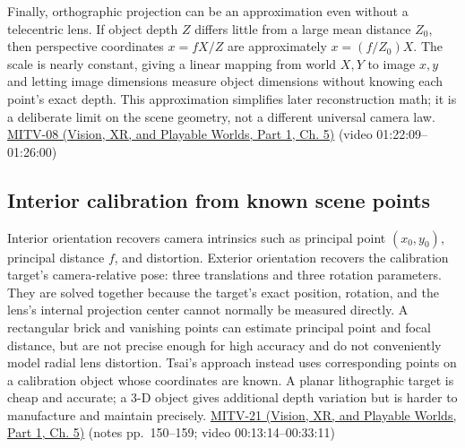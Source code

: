 Finally, orthographic projection can be an approximation even without a telecentric lens. If object depth \(Z\) differs little from a large mean distance \(Z_0\), then perspective coordinates \(x=fX/Z\) are approximately \(x=(f/Z_0)X\). The scale is nearly constant, giving a linear mapping from world \(X,Y\) to image \(x,y\) and letting image dimensions measure object dimensions without knowing each point's exact depth. This approximation simplifies later reconstruction math; it is a deliberate limit on the scene geometry, not a different universal camera law. \href{../07-Vision-XR-and-Playable-Worlds-P01/main.pdf\#nameddest=04-visual-computing-ii-ch036-mitv-08---shading-special-cases-lunar-surface-scanning-electron-microscope-greens-theorem}{MITV-08 (Vision, XR, and Playable Worlds, Part 1, Ch. 5)} (video 01:22:09--01:26:00)

\subsection{Interior calibration from known scene points}\label{03-visual-computing-i-ch003-interior-calibration-from-known-scene-points}

\hypertarget{03-visual-computing-i-ch003-interior-calibration-from-known-scene-points}{}

Interior orientation recovers camera intrinsics such as principal point \((x_0,y_0)\), principal distance \(f\), and distortion. Exterior orientation recovers the calibration target's camera-relative pose: three translations and three rotation parameters. They are solved together because the target's exact position, rotation, and the lens's internal projection center cannot normally be measured directly. A rectangular brick and vanishing points can estimate principal point and focal distance, but are not precise enough for high accuracy and do not conveniently model radial lens distortion. Tsai's approach instead uses corresponding points on a calibration object whose coordinates are known. A planar lithographic target is cheap and accurate; a 3-D object gives additional depth variation but is harder to manufacture and maintain precisely. \href{../07-Vision-XR-and-Playable-Worlds-P01/main.pdf\#nameddest=04-visual-computing-ii-ch036-mitv-21---relative-orientation-binocular-stereo-structure-quadrics-calibration-reprojection}{MITV-21 (Vision, XR, and Playable Worlds, Part 1, Ch. 5)} (notes pp.~150--159; video 00:13:14--00:33:11)

